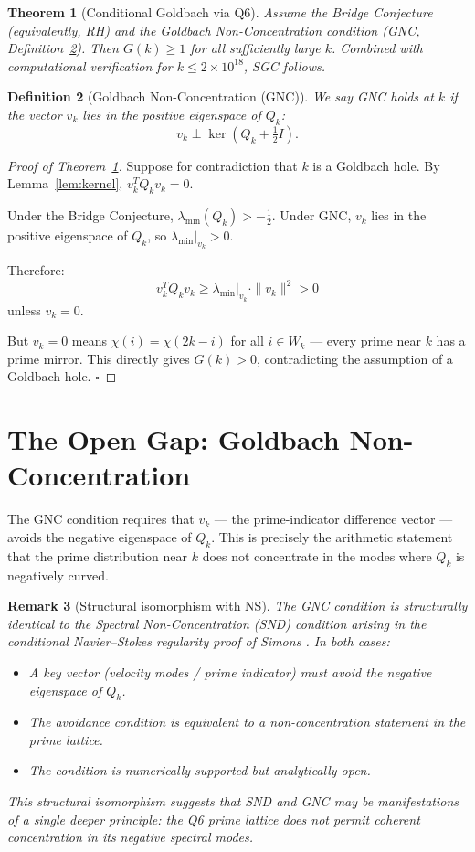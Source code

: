 \documentclass[11pt]{article}
\newtheorem{theorem}{Theorem}
\newtheorem{definition}[theorem]{Definition}
\newtheorem{remark}[theorem]{Remark}
\begin{document}
\begin{theorem}[Conditional Goldbach via Q6]
\label{thm:main}
Assume the Bridge Conjecture (equivalently, RH) and the Goldbach 
Non-Concentration condition (GNC, Definition~\ref{def:gnc}). 
Then $G(k) \geq 1$ for all sufficiently large $k$. Combined with 
computational verification for $k \leq 2 \times 10^{18}$, SGC follows.
\end{theorem}

\begin{definition}[Goldbach Non-Concentration (GNC)]
\label{def:gnc}
We say GNC holds at $k$ if the vector $v_k$ lies in the positive eigenspace of $Q_k$:
\[
v_k \perp \ker(Q_k + \tfrac{1}{2}I).
\]
\end{definition}

\begin{proof}[Proof of Theorem~\ref{thm:main}]
Suppose for contradiction that $k$ is a Goldbach hole. 
By Lemma~\ref{lem:kernel}, $v_k^T Q_k v_k = 0$.

Under the Bridge Conjecture, $\lambda_{\min}(Q_k) > -\tfrac{1}{2}$.
Under GNC, $v_k$ lies in the positive eigenspace of $Q_k$, so $\lambda_{\min}|_{v_k} > 0$.

Therefore:
\[
v_k^T Q_k v_k \geq \lambda_{\min}|_{v_k} \cdot \|v_k\|^2 > 0
\]
unless $v_k = 0$.

But $v_k = 0$ means $\chi(i) = \chi(2k-i)$ for all $i \in W_k$ --- 
every prime near $k$ has a prime mirror. This directly gives $G(k) > 0$,
contradicting the assumption of a Goldbach hole. \qquad $\square$
\end{proof}

\section{The Open Gap: Goldbach Non-Concentration}

The GNC condition requires that $v_k$ --- the prime-indicator difference 
vector --- avoids the negative eigenspace of $Q_k$. This is precisely the 
arithmetic statement that the prime distribution near $k$ does not 
concentrate in the modes where $Q_k$ is negatively curved.

\begin{remark}[Structural isomorphism with NS]
The GNC condition is structurally identical to the Spectral Non-Concentration 
(SND) condition arising in the conditional Navier--Stokes regularity proof 
of Simons \cite{simons2026ns}. In both cases:
\begin{itemize}
\item A key vector (velocity modes / prime indicator) must avoid 
      the negative eigenspace of $Q_k$.
\item The avoidance condition is equivalent to a non-concentration statement 
      in the prime lattice.
\item The condition is numerically supported but analytically open.
\end{itemize}
This structural isomorphism suggests that SND and GNC may be manifestations 
of a single deeper principle: \emph{the Q6 prime lattice does not permit 
coherent concentration in its negative spectral modes.}
\end{remark}
\end{document}
